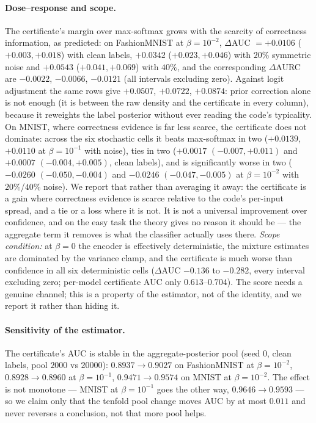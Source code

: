 \documentclass[11pt]{article}
\begin{document}
\paragraph{Dose--response and scope.} The certificate's margin over max-softmax grows with the
scarcity of correctness information, as predicted: on FashionMNIST at $\beta=10^{-2}$,
$\Delta$AUC $=+0.0106$ ($+0.003,+0.018$) with clean labels, $+0.0342$ ($+0.023,+0.046$) with
$20\%$ symmetric noise and $+0.0543$ ($+0.041,+0.069$) with $40\%$, and the corresponding
$\Delta$AURC are $-0.0022$, $-0.0066$, $-0.0121$ (all intervals excluding zero). Against logit
adjustment the same rows give $+0.0507$, $+0.0722$, $+0.0874$: prior correction alone is not enough (it is between the raw density and the certificate in every column),
because it reweights the label posterior without ever reading the code's typicality. On MNIST, where
correctness evidence is far less scarce, the certificate does not dominate: across the six
stochastic cells it beats max-softmax in two ($+0.0139$, $+0.0110$ at $\beta=10^{-1}$ with noise),
ties in two ($+0.0017$ $(-0.007,+0.011)$ and $+0.0007$ $(-0.004,+0.005)$, clean labels), and is
significantly worse in two ($-0.0260$ $(-0.050,-0.004)$ and $-0.0246$ $(-0.047,-0.005)$ at
$\beta=10^{-2}$ with $20\%$/$40\%$ noise). We report that rather than averaging it away: the
certificate is a gain where correctness evidence is scarce relative to the code's per-input
spread, and a tie or a loss where it is not. It is not a universal improvement over confidence,
and on the easy task the theory gives no reason it should be --- the aggregate term it removes is
what the classifier actually uses there. \emph{Scope condition:} at $\beta=0$ the encoder is
effectively deterministic, the mixture estimates are dominated by the variance clamp, and the
certificate is much worse than confidence in all six deterministic cells ($\Delta$AUC
$-0.136$ to $-0.282$, every interval excluding zero; per-model certificate AUC only $0.613$--$0.704$). The
score needs a genuine channel; this is a property of the estimator, not of the identity, and we
report it rather than hiding it.

\paragraph{Sensitivity of the estimator.} The certificate's AUC is stable in the aggregate-posterior
pool (seed 0, clean labels, pool $2000$ vs $20000$): $0.8937\to0.9027$ on FashionMNIST at
$\beta=10^{-2}$, $0.8928\to0.8960$ at $\beta=10^{-1}$, $0.9471\to0.9574$ on MNIST at
$\beta=10^{-2}$. The effect is not monotone --- MNIST at $\beta=10^{-1}$ goes the other way,
$0.9646\to0.9593$ --- so we claim only that the tenfold pool change moves AUC by at most $0.011$
and never reverses a conclusion, not that more pool helps.
\end{document}
